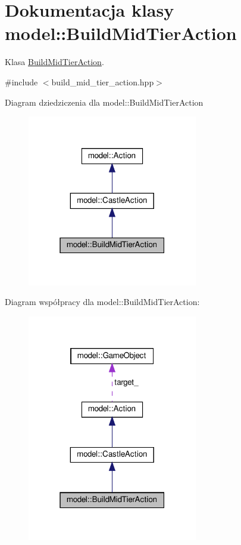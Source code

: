 \hypertarget{classmodel_1_1BuildMidTierAction}{}\section{Dokumentacja klasy model\+:\+:Build\+Mid\+Tier\+Action}
\label{classmodel_1_1BuildMidTierAction}


Klasa \hyperlink{classmodel_1_1BuildMidTierAction}{Build\+Mid\+Tier\+Action}.  




{\ttfamily \#include $<$build\+\_\+mid\+\_\+tier\+\_\+action.\+hpp$>$}



Diagram dziedziczenia dla model\+:\+:Build\+Mid\+Tier\+Action\nopagebreak
\begin{figure}[H]
\begin{center}
\leavevmode
\includegraphics[width=211pt]{classmodel_1_1BuildMidTierAction__inherit__graph}
\end{center}
\end{figure}


Diagram współpracy dla model\+:\+:Build\+Mid\+Tier\+Action\+:\nopagebreak
\begin{figure}[H]
\begin{center}
\leavevmode
\includegraphics[width=211pt]{classmodel_1_1BuildMidTierAction__coll__graph}
\end{center}
\end{figure}

